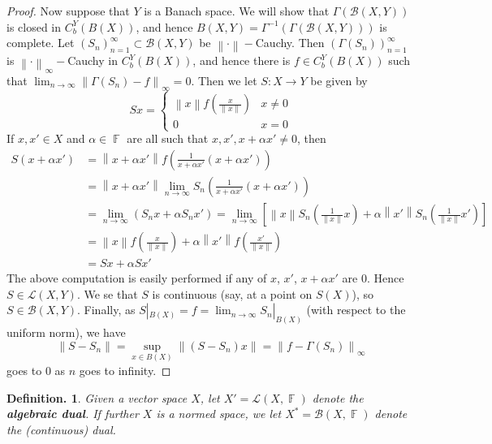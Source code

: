 \documentclass[11pt, a4paper]{memoir}
\DeclareMathOperator{\F}{{\mathbb{F}}}
\newcommand{\norm}[1]{\ensuremath{\left\lVert#1\right\rVert}}
\theoremstyle{change}
\theoremstyle{plain}
\theoremstyle{nonumberplain}
\newtheorem{definition}{Definition.}
\newtheorem{proof}{Proof}
\numberwithin{equation}{section}
\begin{document}
\begin{proof}
    Now suppose that $Y$ is a Banach space.
    We will show that $\Gamma(\mathcal{B}(X,Y))$ is closed in $C_b^Y(B(X))$, and hence $B(X,Y)=\Gamma^{-1}(\Gamma(\mathcal{B}(X,Y)))$ is complete.
    Let $(S_n)_{n=1}^\infty\subset\mathcal{B}(X,Y)$ be $\norm{\cdot}-$Cauchy.
    Then $(\Gamma(S_n))_{n=1}^\infty$ is $\norm{\cdot}_\infty-$Cauchy in $C_b^Y(B(X))$, and hence there is $f\in C_b^Y(B(X))$ such that $\lim_{n\to\infty}\norm{\Gamma(S_n)-f}_\infty=0$.
    Then we let $S:X\to Y$ be given by
    \begin{equation*}
        Sx=\begin{cases}
            \norm{x}f\left(\frac{x}{\norm{x}}\right) & x\neq 0\\
            0 & x=0
        \end{cases}
    \end{equation*}
    If $x,x'\in X$ and $\alpha\in\F$ are all such that $x,x',x+\alpha x'\neq 0$, then
    \begin{align*}
        S(x+\alpha x') &= \norm{x+\alpha x'}f\left(\frac{1}{x+\alpha x'}(x+\alpha x')\right)\\
                       &= \norm{x+\alpha x'}\lim_{n\to\infty} S_n\left(\frac{1}{x+\alpha x'}(x+\alpha x')\right)\\
                       &= \lim_{n\to\infty}(S_nx+\alpha S_nx')=\lim_{n\to\infty}\left[\norm{x}S_n\left(\frac{1}{\norm{x}}x\right)+\alpha\norm{x'}S_n\left(\frac{1}{\norm{x}}x'\right)\right]\\
                       &= \norm{x}f\left(\frac{x}{\norm{x}}\right)+\alpha\norm{x'}f\left(\frac{x'}{\norm{x}}\right)\\
                       &= Sx+\alpha Sx'
    \end{align*}
    The above computation is easily performed if any of $x$, $x'$, $x+\alpha x'$ are 0.
    Hence $S\in\mathcal{L}(X,Y)$.
    We se that $S$ is continuous (say, at a point on $S(X)$), so $S\in\mathcal{B}(X,Y)$.
    Finally, as $S|_{B(X)}=f=\lim_{n\to\infty}S_n|_{B(X)}$ (with respect to the uniform norm), we have
    \begin{equation*}
        \norm{S-S_n}=\sup_{x\in B(X)}\norm{(S-S_n)x}=\norm{f-\Gamma(S_n)}_\infty
    \end{equation*}
    goes to $0$ as $n$ goes to infinity.
\end{proof}
\begin{definition}
    Given a vector space $X$, let $X'=\mathcal{L}(X,\F)$ denote the \textbf{algebraic dual}.
    If further $X$ is a normed space, we let $X^*=\mathcal{B}(X,\F)$ denote the (continuous) dual.
\end{definition}
\end{document}
